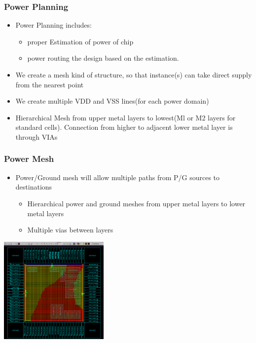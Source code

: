 \documentclass[compress]{beamer}
\begin{document}
\begin{frame}
	\frametitle{Power Planning}
		\begin{itemize}
			\item Power Planning includes: 
			\begin{itemize}
				\item proper Estimation of power of chip
				\item power routing the design based on the estimation.
			\end{itemize}
			\item We create a mesh kind of structure, so that instance(s)
			can take direct supply from the nearest point
			\item We create multiple VDD and VSS lines(for each
			power domain)
			\item Hierarchical Mesh from upper metal layers to
			lowest(Ml or M2 layers for standard cells). Connection
			from higher to adjacent lower metal layer is through
			VIAs
		\end{itemize}
\end{frame}
\begin{frame}
	\frametitle{Power Mesh}
\begin{itemize}
	\item Power/Ground mesh will allow multiple paths
	from P/G sources to destinations		
	\begin{itemize}
		\item Hierarchical power and ground meshes
		from upper metal layers to lower metal layers
		\item  Multiple vias between layers
	\end{itemize}
\end{itemize}

	\begin{center}
		\includegraphics[width=0.4\textwidth]{Power mesh}
	\end{center}
\end{frame}
\end{document}
